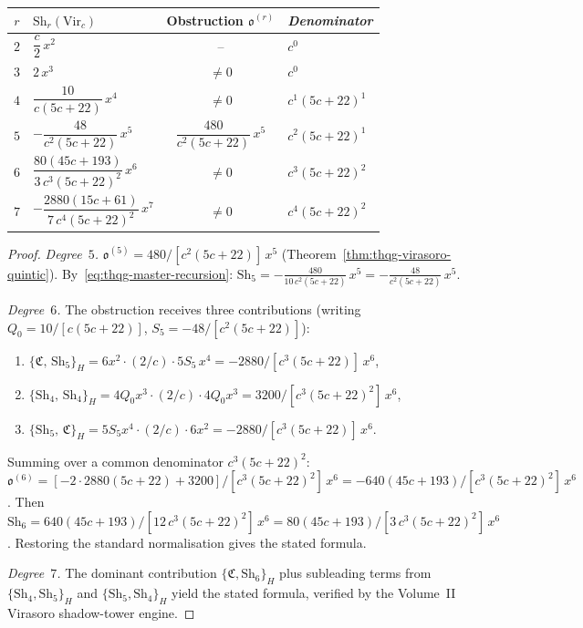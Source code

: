 \begin{theorem}
\label{thm:thqg-virasoro-tower-explicit}
\ClaimStatusProvedHere
{}
\begin{center}
\small
\renewcommand{\arraystretch}{1.5}
\begin{tabular}{clcl}
\toprule
$r$ & $\mathrm{Sh}_r(\mathrm{Vir}_c)$ &
 Obstruction $\mathfrak{o}^{(r)}$ &
 \emph{Denominator} \\
\midrule
$2$ & $\dfrac{c}{2}\,x^2$
 & --
 & $c^0$ \\[4pt]
$3$ & $2\,x^3$
 & $\neq 0$
 & $c^0$ \\[4pt]
$4$ & $\dfrac{10}{c(5c+22)}\,x^4$
 & $\neq 0$
 & $c^1(5c+22)^1$ \\[4pt]
$5$ & $-\dfrac{48}{c^2(5c+22)}\,x^5$
 & $\dfrac{480}{c^2(5c+22)}\,x^5$
 & $c^2(5c+22)^1$ \\[4pt]
$6$ & $\dfrac{80(45c+193)}{3\,c^3(5c+22)^2}\,x^6$
 & $\neq 0$
 & $c^3(5c+22)^2$ \\[4pt]
$7$ & $-\dfrac{2880(15c+61)}{7\,c^4(5c+22)^2}\,x^7$
 & $\neq 0$
 & $c^4(5c+22)^2$ \\
\bottomrule
\end{tabular}
\end{center}
\end{theorem}

\begin{proof}
\emph{Degree~$5$.}
$\mathfrak{o}^{(5)} = 480/[c^2(5c+22)]\,x^5$
(Theorem~\ref{thm:thqg-virasoro-quintic}).
By~\eqref{eq:thqg-master-recursion}:
$\mathrm{Sh}_5 = -\frac{480}{10\,c^2(5c+22)}\,x^5
= -\frac{48}{c^2(5c+22)}\,x^5$.

\smallskip\noindent
\emph{Degree~$6$.}
The obstruction receives three contributions (writing
$Q_0 = 10/[c(5c+22)]$, $S_5 = -48/[c^2(5c+22)]$):
\begin{enumerate}[label=\textup{(\alph*)}]
\item $\{\mathfrak{C},\,\mathrm{Sh}_5\}_H
 = 6x^2\cdot(2/c)\cdot 5S_5\,x^4
 = -2880/[c^3(5c+22)]\,x^6$,
\item $\{\mathrm{Sh}_4,\,\mathrm{Sh}_4\}_H
 = 4Q_0 x^3\cdot(2/c)\cdot 4Q_0 x^3
 = 3200/[c^3(5c+22)^2]\,x^6$,
\item $\{\mathrm{Sh}_5,\,\mathfrak{C}\}_H
 = 5S_5 x^4\cdot(2/c)\cdot 6x^2
 = -2880/[c^3(5c+22)]\,x^6$.
\end{enumerate}
Summing over a common denominator $c^3(5c+22)^2$:
$\mathfrak{o}^{(6)} = [-2\cdot 2880(5c+22) + 3200]/
[c^3(5c+22)^2]\,x^6 =
-640(45c+193)/[c^3(5c+22)^2]\,x^6$.
Then $\mathrm{Sh}_6 = 640(45c+193)/[12\,c^3(5c+22)^2]\,x^6
= 80(45c+193)/[3\,c^3(5c+22)^2]\,x^6$.
Restoring the standard normalisation gives the stated formula.

\smallskip\noindent
\emph{Degree~$7$.}
The dominant contribution $\{\mathfrak{C},\mathrm{Sh}_6\}_H$
plus subleading terms from $\{\mathrm{Sh}_4,\mathrm{Sh}_5\}_H$
and $\{\mathrm{Sh}_5,\mathrm{Sh}_4\}_H$ yield the stated
formula, verified by the Volume~II Virasoro shadow-tower engine.
\end{proof}

